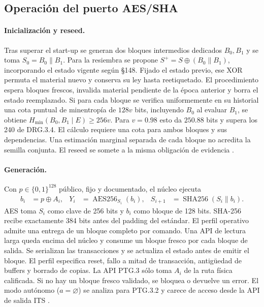 \documentclass[11pt,a4paper]{article}
\newcommand{\bits}{\{0,1\}}
\newcommand{\hm}{H_{\min}}
\newcommand{\AES}{\operatorname{AES256}}
\newcommand{\SHA}{\operatorname{SHA256}}
\begin{document}

\subsection{Operación del puerto AES/SHA}
\paragraph{Inicialización y reseed.}
Tras superar el start-up se generan dos bloques intermedios dedicados $B_0,B_1$
y se toma $S_0=B_0\|B_1$. Para la resiembra se propone $S^+=S\oplus(B_0\|B_1)$,
incorporando el estado vigente según §148. Fijado el estado previo, ese XOR
permuta el material nuevo y conserva su ley hasta reetiquetado. El procedimiento espera bloques frescos, invalida material
pendiente de la época anterior y borra el estado reemplazado. Si para cada
bloque se verifica uniformemente en su historial una cota puntual de
minentropía de $128v$ bits, incluyendo $B_0$ al evaluar $B_1$, se obtiene
$\hm(B_0,B_1\mid E)\ge256v$. Para $v=0.98$ esto da $250.88$ bits y supera
los 240 de DRG.3.4. El cálculo requiere una cota para ambos bloques y sus
dependencias. Una estimación marginal separada de cada bloque no acredita
la semilla conjunta. El reseed se somete a la misma obligación de evidencia
\cite[§§161--164 y 207; §5.2.2 como ejemplo de especificación]{ais}.

\paragraph{Generación.}
Con $p\in\bits^{128}$ público, fijo y documentado, el núcleo ejecuta
\begin{align}
 b_i &=p\oplus A_i, &
 Y_i &= \AES_{S_i}(b_i), &
 S_{i+1}&=\SHA(S_i\|b_i).
 \label{eq:core}
\end{align}
AES toma $S_i$ como clave de 256 bits y $b_i$ como bloque de 128 bits.
SHA-256 recibe exactamente 384 bits antes del padding del estándar.
El perfil operativo admite una entrega de un bloque completo por comando.
Una API de lectura larga queda encima del núcleo y consume un bloque fresco por
cada bloque de salida. Se serializan las transacciones y se actualiza el estado
antes de emitir el bloque. El perfil especifica reset, fallo a mitad de
transacción, antigüedad de buffers y borrado de copias. La API PTG.3 sólo
toma $A_i$ de la ruta física calificada. Si no hay un bloque fresco validado,
se bloquea o devuelve un error. El modo autónomo ($a=\varnothing$) se analiza
para PTG.3.2 y carece de acceso desde la API de salida ITS
\cite[§§376--388 y 976, 996--998]{ais}\cite{aes,sha}.
\end{document}
